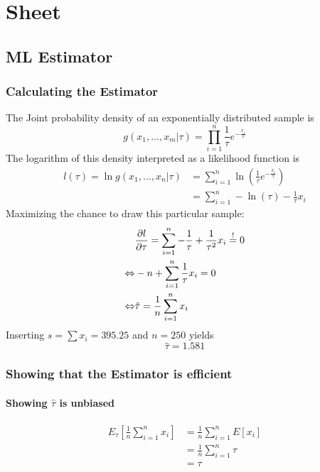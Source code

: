 \section{Sheet}
\subsection{ML Estimator}
\subsubsection{Calculating the Estimator}
The Joint probability density of an exponentially distributed sample is
\begin{equation}
    g\left(x_1,\dots,x_m\vert \tau\right) =\prod_{i=1}^{n}\frac{1}{\tau}e^{-\frac{x_i}{\tau}}
\end{equation}
The logarithm of this density interpreted as a likelihood function is
\begin{align}
    l\left(\tau\right)=\ln g\left(x_1,\dots,x_n\vert \tau\right)&=\sum_{i=1}^n \ln\left(\frac{1}{\tau}e^{-\frac{x_i}{\tau}}\right)
    \\&=\sum_{i=1}^n -\ln\left(\tau\right)-\frac{1}{\tau}x_i
\end{align}
Maximizing the chance to draw this particular sample:
\begin{align}
    &\pdv{l}{\tau}=\sum_{i=1}^n -\frac{1}{\tau}+\frac{1}{\tau^2}x_i \overset{!}{=} 0
    \\\Leftrightarrow&-n +\sum_{i=1}^n\frac{1}{\tau}x_i = 0 
    \\\Leftrightarrow&\hat{\tau} = \frac{1}{n}\sum^n_{i=1}x_i
\end{align}
Inserting $s=\sum x_i = 395.25$ and $n=250$ yields
\begin{equation}
    \hat{\tau} = 1.581
\end{equation}
\subsubsection{Showing that the Estimator is efficient}
\paragraph{Showing $\hat{\tau}$ is unbiased}
\begin{align}
    E_\tau\left[\frac{1}{n}\sum_{i=1}^nx_i\right]&=\frac{1}{n}\sum_{i=1}^n E\left[x_i\right]
    \\&=\frac{1}{n}\sum_{i=1}^n\tau
    \\&=\tau
\end{align}
